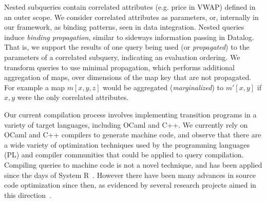 Nested subqueries contain correlated attributes (e.g. price in VWAP)
defined in an outer scope. We consider correlated attributes as parameters, or,
internally in our framework, as binding patterns, seen in data integration.
Nested queries induce \textit{binding propagation}, similar to sideways
information passing in Datalog. That is, we support the results of one query
being used (or \textit{propagated}) to the parameters of a correlated subquery,
indicating an evaluation ordering.
We transform queries to use minimal propagation, which performs additional
aggregation of maps, over dimensions of the map key that are not propagated. For
example a map $m[x,y,z]$ would be aggregated (\textit{marginalized}) to
$m'[x,y]$ if $x,y$ were the only correlated attributes.





Our current compilation process involves implementing transition programs in a
variety of target languages, including OCaml and C++. We currently rely on OCaml
and C++ compilers to generate machine code, and observe that there are a wide
variety of optimization techniques used by the programming languages (PL) and
compiler communities that could be applied to query compilation. Compiling
queries to machine code is not a novel technique, and has been applied since the
days of System R~\cite{chamberlin-tods:81}. However there have been many
advances in source code optimization since then, as evidenced by several
research projects aimed in this
direction~\cite{arumugam-sigmod:10,krikellas-icde:10}.


